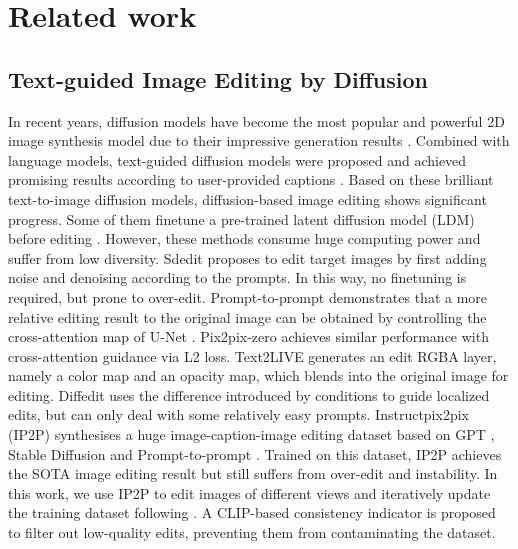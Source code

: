 \section{Related work}
\label{sec: related work}

\subsection{Text-guided Image Editing by Diffusion}
In recent years, diffusion models have become the most popular and powerful 2D image synthesis model due to their impressive generation results \cite{sohl2015deep, ho2020denoising, song2020denoising, song2022diffusion}. Combined with language models, text-guided diffusion models were proposed and achieved promising results according to user-provided captions \cite{nichol2021glide, rombach2022high, saharia2022photorealistic, ramesh2022hierarchical}. Based on these brilliant text-to-image diffusion models, diffusion-based image editing shows significant progress. Some of them finetune a pre-trained latent diffusion model (LDM) before editing \cite{zhang2022sine, valevski2022unitune, kawar2023imagic}. However, these methods consume huge computing power and suffer from low diversity. Sdedit \cite{meng2021sdedit} proposes to edit target images by first adding noise and denoising according to the prompts. In this way, no finetuning is required, but prone to over-edit. Prompt-to-prompt \cite{hertz2022prompt} demonstrates that a more relative editing result to the original image can be obtained by controlling the cross-attention map of U-Net \cite{ronneberger2015u}. Pix2pix-zero \cite{parmar2023zero} achieves similar performance with cross-attention guidance via L2 loss. Text2LIVE \cite{bar2022text2live} generates an edit RGBA layer, namely a color map and an opacity map, which blends into the original image for editing. Diffedit \cite{couairon2022diffedit} uses the difference introduced by conditions to guide localized edits, but can only deal with some relatively easy prompts. Instructpix2pix (IP2P) \cite{brooks2023instructpix2pix} synthesises a huge image-caption-image editing dataset based on GPT \cite{brown2020language}, Stable Diffusion \cite{rombach2022high} and Prompt-to-prompt \cite{hertz2022prompt}. Trained on this dataset, IP2P achieves the SOTA image editing result but still suffers from over-edit and instability. In this work, we use IP2P to edit images of different views and iteratively update the training dataset following \cite{haque2023instruct}. A CLIP-based consistency indicator is proposed to filter out low-quality edits, preventing them from contaminating the dataset.

